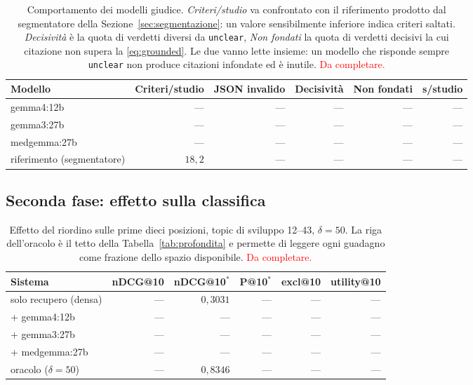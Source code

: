 \documentclass[pdflatex,sn-mathphys-num]{sn-jnl}
\theoremstyle{thmstyleone}
\theoremstyle{thmstyletwo}
\theoremstyle{thmstylethree}
\newcommand{\ev}[1]{\textcolor{red}{#1}}
\begin{document}
\begin{table}[H]
\centering
\begin{tabular}{lrrrrr}
\toprule
Modello & Criteri/studio & JSON invalido & Decisività & Non fondati & s/studio \\
\midrule
gemma4:12b     & --- & --- & --- & --- & --- \\
gemma3:27b     & --- & --- & --- & --- & --- \\
medgemma:27b   & --- & --- & --- & --- & --- \\
\midrule
riferimento (segmentatore) & $18{,}2$ & --- & --- & --- & --- \\
\bottomrule
\end{tabular}
\caption{Comportamento dei modelli giudice. \emph{Criteri/studio} va confrontato con il riferimento prodotto dal segmentatore della Sezione~\ref{sec:segmentazione}: un valore sensibilmente inferiore indica criteri saltati. \emph{Decisività} è la quota di verdetti diversi da \texttt{unclear}, \emph{Non fondati} la quota di verdetti decisivi la cui citazione non supera la \eqref{eq:grounded}. Le due vanno lette insieme: un modello che risponde sempre \texttt{unclear} non produce citazioni infondate ed è inutile. \ev{Da completare.}}
\label{tab:comportamento}
\end{table}

\subsection{Seconda fase: effetto sulla classifica}\label{sec:res-giudici}

\begin{table}[H]
\centering
\begin{tabular}{lrrrrr}
\toprule
Sistema & nDCG@10 & nDCG@10$^{*}$ & P@10$^{*}$ & excl@10 & utility@10 \\
\midrule
solo recupero (densa)      & --- & $0{,}3031$ & --- & --- & --- \\
\midrule
+ gemma4:12b               & --- & --- & --- & --- & --- \\
+ gemma3:27b               & --- & --- & --- & --- & --- \\
+ medgemma:27b             & --- & --- & --- & --- & --- \\
\midrule
oracolo ($\delta = 50$)    & --- & $0{,}8346$ & --- & --- & --- \\
\bottomrule
\end{tabular}
\caption{Effetto del riordino sulle prime dieci posizioni, topic di sviluppo 12--43, $\delta = 50$. La riga dell'oracolo è il tetto della Tabella~\ref{tab:profondita} e permette di leggere ogni guadagno come frazione dello spazio disponibile. \ev{Da completare.}}
\label{tab:riordino}
\end{table}
\end{document}
